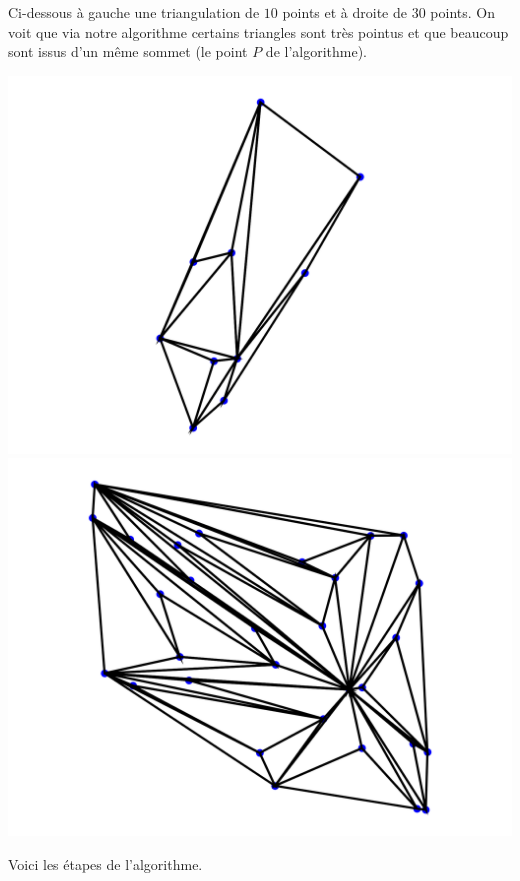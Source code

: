 \documentclass[11pt,class=report,crop=false]{standalone}
\begin{document}
Ci-dessous à gauche une triangulation de $10$ points et à droite de $30$ points.
On voit que via notre algorithme certains triangles sont très pointus et que beaucoup sont issus d'un même sommet (le point $P$ de l'algorithme).
\begin{center}
	\includegraphics[scale=\myscale,scale=0.4]{figures/triangulation01}
	\qquad
	\includegraphics[scale=\myscale,scale=0.4]{figures/triangulation02}	
\end{center}


Voici les étapes de l'algorithme.

\end{document}
